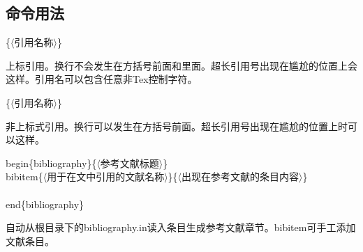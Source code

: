 \documentclass[a4paper]{article}
\begin{document}
	\subsection{命令用法}
	\begin{body}
		\{{\color{gray}$\langle$引用名称$\rangle$}\}\par
		上标引用。换行不会发生在方括号前面和里面。超长引用号出现在尴尬的位置上会这样\cite{thesis1,standard1,standard2,book1,book2,standard4,journal1,空白,empty2}。引用名可以包含任意非Tex控制字符。\par
		\{{\color{gray}$\langle$引用名称$\rangle$}\}\par
		非上标式引用。换行可以发生在方括号前面。超长引用号出现在尴尬的位置上时可以这样。\par
		{\color{purple}\noindent{\bslash}begin\{{\color{teal}bibliography}\}}\{{\color{gray}$\langle$参考文献标题$\rangle$}\}\\
		{\color{purple}\indent{\bslash}bibitem}\{{\color{gray}$\langle$用于在文中引用的文献名称$\rangle$}\}\{{\color{gray}$\langle$出现在参考文献的条目内容$\rangle$}\}\\
		\\
		{\color{purple}{\bslash}end\{{\color{teal}bibliography}\}}\par
		自动从根目录下的bibliography.in读入条目生成参考文献章节。\bslash{}bibitem可手工添加文献条目。\par
	\end{body}
\end{document}
